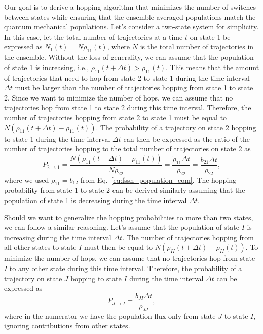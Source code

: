 Our goal is to derive a hopping algorithm that minimizes the number of switches between states while ensuring that the ensemble-averaged populations match the quantum mechanical populations. Let's consider a two-state system for simplicity. In this case, let the total number of trajectories at a time $t$ on state 1 be expressed as $N_1(t)=N\rho_{11}(t)$, where $N$ is the total number of trajectories in the ensemble. Without the loss of generality, we can assume that the population of state 1 is increasing, i.e., $\rho_{11}(t+\Delta t)>\rho_{11}(t)$. This means that the amount of trajectories that need to hop from state 2 to state 1 during the time interval $\Delta t$ must be larger than the number of trajectories hopping from state 1 to state 2. Since we want to minimize the number of hops, we can assume that no trajectories hop from state 1 to state 2 during this time interval. Therefore, the number of trajectories hopping from state 2 to state 1 must be equal to $N\left(\rho_{11}(t+\Delta t)-\rho_{11}(t)\right)$. The probability of a trajectory on state 2 hopping to state 1 during the time interval $\Delta t$ can then be expressed as the ratio of the number of trajectories hopping to the total number of trajectories on state 2 as
\begin{equation}\label{eq:fssh_hopping_probability_two_state}
P_{2\to 1}=\frac{N\left(\rho_{11}(t+\Delta t)-\rho_{11}(t)\right)}{N\rho_{22}}=\frac{\dot\rho_{11}\Delta t}{\rho_{22}}=\frac{b_{21}\Delta t}{\rho_{22}},
\end{equation}
where we used $\dot\rho_{11}=b_{12}$ from Eq.~\eqref{eq:fssh_population_eom}. The hopping probability from state 1 to state 2 can be derived similarly assuming that the population of state 1 is decreasing during the time interval $\Delta t$.

Should we want to generalize the hopping probabilities to more than two states, we can follow a similar reasoning. Let's assume that the population of state $I$ is increasing during the time interval $\Delta t$. The number of trajectories hopping from all other states to state $I$ must then be equal to $N\left(\rho_{II}(t+\Delta t)-\rho_{II}(t)\right)$. To minimize the number of hops, we can assume that no trajectories hop from state $I$ to any other state during this time interval. Therefore, the probability of a trajectory on state $J$ hopping to state $I$ during the time interval $\Delta t$ can be expressed as
\begin{equation}\label{eq:fssh_hopping_probability_multistate}
P_{J\to I}=\frac{b_{JI}\Delta t}{\rho_{JJ}},
\end{equation}
where in the numerator we have the population flux only from state $J$ to state $I$, ignoring contributions from other states.
